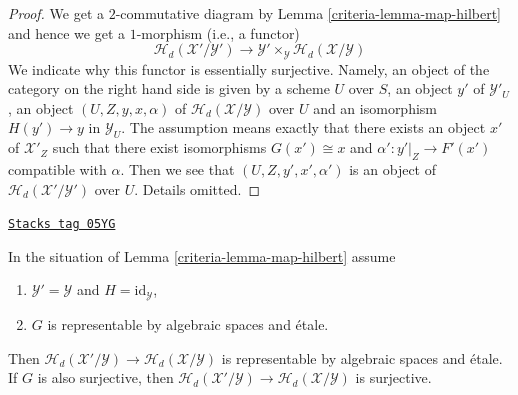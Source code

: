\begin{proof}

We get a $2$-commutative diagram by
Lemma \ref{criteria-lemma-map-hilbert}
and hence we get a $1$-morphism (i.e., a functor)
$$
\mathcal{H}_d(\mathcal{X}'/\mathcal{Y}')
\longrightarrow
\mathcal{Y}' \times_\mathcal{Y} \mathcal{H}_d(\mathcal{X}/\mathcal{Y})
$$
We indicate why this functor is essentially surjective. Namely, an object
of the category on the right hand side is given by a scheme $U$ over $S$,
an object $y'$ of $\mathcal{Y}'_U$, an object $(U, Z, y, x, \alpha)$
of $\mathcal{H}_d(\mathcal{X}/\mathcal{Y})$ over $U$ and an isomorphism
$H(y') \to y$ in $\mathcal{Y}_U$. The assumption means exactly that
there exists an object $x'$ of $\mathcal{X}'_Z$ such that there exist
isomorphisms $G(x') \cong x$ and $\alpha' : y'|_Z \to F'(x')$ compatible
with $\alpha$. Then we see that $(U, Z, y', x', \alpha')$ is an
object of $\mathcal{H}_d(\mathcal{X}'/\mathcal{Y}')$ over $U$.
Details omitted.
\end{proof}

\begin{lemma}
\label{criteria-lemma-etale-covering-hilbert}
\href{https://stacks.math.columbia.edu/tag/05YG}{\texttt{Stacks tag 05YG}}

In the situation of
Lemma \ref{criteria-lemma-map-hilbert}
assume
\begin{enumerate}
\item $\mathcal{Y}' = \mathcal{Y}$ and $H = \text{id}_\mathcal{Y}$,
\item $G$ is representable by algebraic spaces and \'etale.
\end{enumerate}
Then $\mathcal{H}_d(\mathcal{X}'/\mathcal{Y}) \to
\mathcal{H}_d(\mathcal{X}/\mathcal{Y})$ is representable by
algebraic spaces and \'etale.
If $G$ is also surjective, then
$\mathcal{H}_d(\mathcal{X}'/\mathcal{Y}) \to
\mathcal{H}_d(\mathcal{X}/\mathcal{Y})$ is surjective.
\end{lemma}

